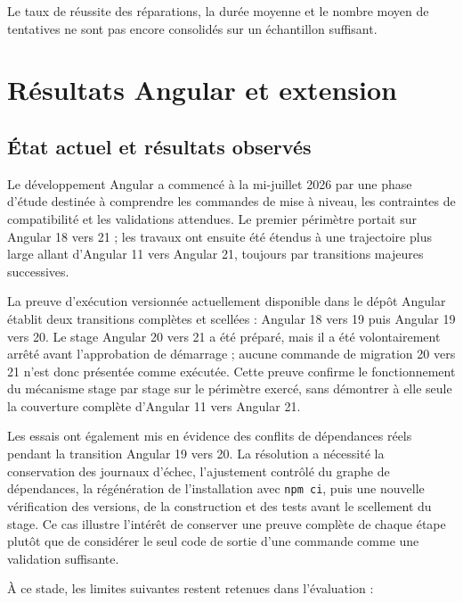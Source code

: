 Le taux de réussite des réparations, la durée moyenne et le nombre moyen de tentatives ne sont pas encore consolidés sur un échantillon suffisant.

\section{Résultats Angular et extension}

\subsection{État actuel et résultats observés}

Le développement Angular a commencé à la mi-juillet 2026 par une phase d'étude destinée à comprendre les commandes de mise à niveau, les contraintes de compatibilité et les validations attendues. Le premier périmètre portait sur Angular 18 vers 21 ; les travaux ont ensuite été étendus à une trajectoire plus large allant d'Angular 11 vers Angular 21, toujours par transitions majeures successives.

La preuve d'exécution versionnée actuellement disponible dans le dépôt Angular établit deux transitions complètes et scellées : Angular 18 vers 19 puis Angular 19 vers 20. Le stage Angular 20 vers 21 a été préparé, mais il a été volontairement arrêté avant l'approbation de démarrage ; aucune commande de migration 20 vers 21 n'est donc présentée comme exécutée. Cette preuve confirme le fonctionnement du mécanisme stage par stage sur le périmètre exercé, sans démontrer à elle seule la couverture complète d'Angular 11 vers Angular 21.

Les essais ont également mis en évidence des conflits de dépendances réels pendant la transition Angular 19 vers 20. La résolution a nécessité la conservation des journaux d'échec, l'ajustement contrôlé du graphe de dépendances, la régénération de l'installation avec \texttt{npm ci}, puis une nouvelle vérification des versions, de la construction et des tests avant le scellement du stage. Ce cas illustre l'intérêt de conserver une preuve complète de chaque étape plutôt que de considérer le seul code de sortie d'une commande comme une validation suffisante.

À ce stade, les limites suivantes restent retenues dans l'évaluation :

